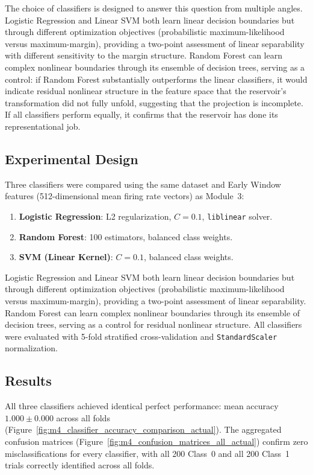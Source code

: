 The choice of classifiers is designed to answer this question from multiple angles. Logistic Regression and Linear SVM both learn linear decision boundaries but through different optimization objectives (probabilistic maximum-likelihood versus maximum-margin), providing a two-point assessment of linear separability with different sensitivity to the margin structure. Random Forest can learn complex nonlinear boundaries through its ensemble of decision trees, serving as a control: if Random Forest substantially outperforms the linear classifiers, it would indicate residual nonlinear structure in the feature space that the reservoir's transformation did not fully unfold, suggesting that the projection is incomplete. If all classifiers perform equally, it confirms that the reservoir has done its representational job.

\subsection{Experimental Design}

Three classifiers were compared using the same dataset and Early Window features (512-dimensional mean firing rate vectors) as Module~3:
\begin{enumerate}
    \item \textbf{Logistic Regression}: L2 regularization, $C = 0.1$, \texttt{liblinear} solver.
    \item \textbf{Random Forest}: 100 estimators, balanced class weights.
    \item \textbf{SVM (Linear Kernel)}: $C = 0.1$, balanced class weights.
\end{enumerate}
Logistic Regression and Linear SVM both learn linear decision boundaries but through different optimization objectives (probabilistic maximum-likelihood versus maximum-margin), providing a two-point assessment of linear separability. Random Forest can learn complex nonlinear boundaries through its ensemble of decision trees, serving as a control for residual nonlinear structure. All classifiers were evaluated with 5-fold stratified cross-validation and \texttt{StandardScaler} normalization.

\subsection{Results}

All three classifiers achieved identical perfect performance: mean accuracy $1.000 \pm 0.000$ across all folds (Figure~\ref{fig:m4_classifier_accuracy_comparison_actual}). The aggregated confusion matrices (Figure~\ref{fig:m4_confusion_matrices_all_actual}) confirm zero misclassifications for every classifier, with all 200 Class~0 and all 200 Class~1 trials correctly identified across all folds.


